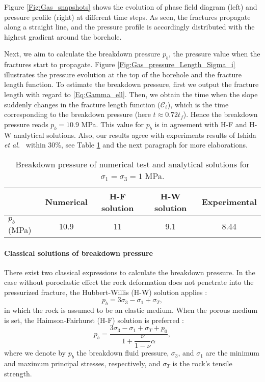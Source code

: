 Figure \ref{Fig:Gas_snapshots} shows the evolution of phase field diagram (left) and pressure profile (right) at different time steps. As seen, the fractures propagate along a straight line, and the pressure profile is accordingly distributed with the highest gradient around the borehole.

Next, we aim to calculate the breakdown pressure $p_b$, the pressure value when %
the fractures start to propagate.
Figure \ref{Fig:Gas_pressure_Length_Sigma_i} illustrates the pressure evolution at the top of the borehole and the fracture length function. To estimate the breakdown pressure, first we output the fracture length with regard to \eqref{Eq:Gamma_ell}.  Then, we obtain the time when the slope suddenly changes in the fracture length function ($\mathcal{C}_{\ell}$), which is the time corresponding to the breakdown pressure (here $t\approx 0.72t_f$). Hence the breakdown pressure reads $p_b =10.9$ MPa. This value for $p_b$ is in agreement with H-F and H-W analytical solutions. Also, our results agree  with experiments results of Ishida \emph{et al.}~\cite{ishida2012acoustic} within 30\%, see Table \ref{Tab:preakdown_ISO_insitustress} and the next paragraph for more elaborations. 
\begin{table}[htbp]
	\centering
	\caption{Breakdown pressure of numerical test and analytical solutions for $\sigma_1=\sigma_3=1$ MPa.}
	\begin{tabular}{l c c c c}
		\hline 
		& Numerical & H-F solution & H-W solution & Experimental \cite{ishida2012acoustic}  \\
		\hline 
		$p_b$ (MPa) & 10.9 & 11 &  9.1 & 8.44\\
		\hline      
	\end{tabular}
	\label{Tab:preakdown_ISO_insitustress}
\end{table}

\paragraph{Classical solutions of breakdown pressure} There exist two classical expressions to calculate the breakdown pressure. In the case without poroelastic effect the rock deformation does not penetrate into the pressurized fracture, the Hubbert-Willis (H-W) solution applies \cite{hubbert1972mechanics}:
\begin{equation*}
    p_b =3 \sigma_{3}- \sigma_{1}+\sigma_T,
\end{equation*}
in which the rock is assumed to be an elastic medium. When the porous medium is set, the Haimson-Fairhurst (H-F) solution is preferred \cite{haimson1967initiation}:
\begin{equation*}
    p_b=\dfrac{3\sigma_{3}- \sigma_{1}+\sigma_T+p_0}{1+\dfrac{\nu}{1-\nu}\alpha},
\end{equation*}
where we denote by $p_b$ the breakdown fluid pressure, $\sigma_{3}$, and $\sigma_{1}$ are the minimum and maximum principal stresses, respectively, and $\sigma_T$ is the rock's tensile strength.

